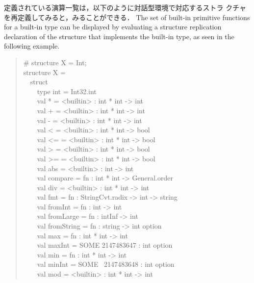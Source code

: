 \documentclass{jbook}
\newcommand{\myem}{\mbox{\ \ }}
\newenvironment{program}{\begin{quote}\begin{tt}}%
                        {\end{tt}\end{quote}}
\begin{document}
\ifjp%
	定義されている演算一覧は，以下のように対話型環境で対応するストラ
クチャを再定義してみると，みることができる．
\else%
	The set of built-in primitive functions for a built-in type can be
displayed by evaluating a structure replication declaration of the
structure that implements the built-in type, as seen in the following example.
\fi%
\begin{program}
\# structure X = Int;\\
structure X =\\
\myem  struct\\
\myem\myem    type int = Int32.int\\
\myem\myem    val * = <builtin> : int * int -> int\\
\myem\myem    val + = <builtin> : int * int -> int\\
\myem\myem    val - = <builtin> : int * int -> int\\
\myem\myem    val < = <builtin> : int * int -> bool\\
\myem\myem    val <= = <builtin> : int * int -> bool\\
\myem\myem    val > = <builtin> : int * int -> bool\\
\myem\myem    val >= = <builtin> : int * int -> bool\\
\myem\myem    val abs = <builtin> : int -> int\\
\myem\myem    val compare = fn : int * int -> General.order\\
\myem\myem    val div = <builtin> : int * int -> int\\
\myem\myem    val fmt = fn : StringCvt.radix -> int -> string\\
\myem\myem    val fromInt = fn : int -> int\\
\myem\myem    val fromLarge = fn : intInf -> int\\
\myem\myem    val fromString = fn : string -> int option\\
\myem\myem    val max = fn : int * int -> int\\
\myem\myem    val maxInt = SOME 2147483647 : int option\\
\myem\myem    val min = fn : int * int -> int\\
\myem\myem    val minInt = SOME ~2147483648 : int option\\
\myem\myem    val mod = <builtin> : int * int -> int\\

\end{program}
\end{document}
